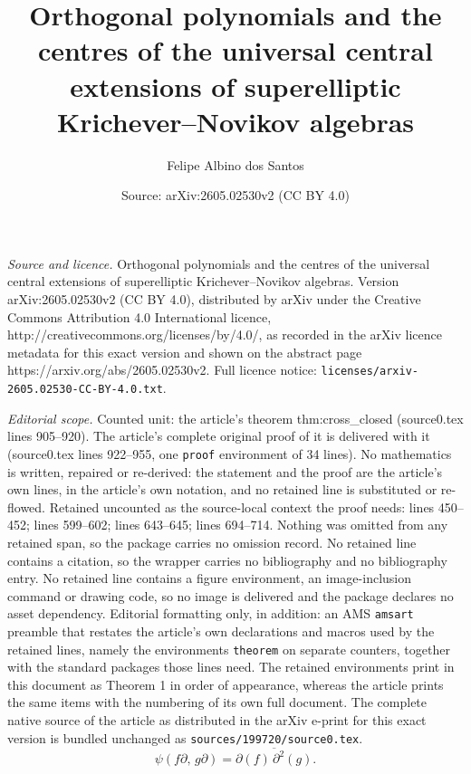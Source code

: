 \documentclass[10pt,a4paper]{amsart}
\title{Orthogonal polynomials and the centres of the universal central extensions of superelliptic Krichever--Novikov algebras}
\author{Felipe Albino dos Santos}
\date{Source: arXiv:2605.02530v2 (CC BY 4.0)}
\newcommand{\ol}[1]{\overline{#1}}
\newcommand{\pa}{\partial}
\begin{document}
\maketitle

\noindent\emph{Source and licence.} Orthogonal polynomials and the centres of the universal central extensions of superelliptic Krichever--Novikov algebras. Version arXiv:2605.02530v2 (CC BY 4.0), distributed by arXiv under the Creative Commons Attribution 4.0 International licence, http://creativecommons.org/licenses/by/4.0/, as recorded in the arXiv licence metadata for this exact version and shown on the abstract page https://arxiv.org/abs/2605.02530v2. Full licence notice: \texttt{licenses/arxiv-2605.02530-CC-BY-4.0.txt}.\par\smallskip

\noindent\textit{Editorial scope.} Counted unit: the article's theorem thm:cross\_closed (source0.tex lines 905--920). The article's complete original proof of it is delivered with it (source0.tex lines 922--955, one \texttt{proof} environment of 34 lines). No mathematics is written, repaired or re-derived: the statement and the proof are the article's own lines, in the article's own notation, and no retained line is substituted or re-flowed.  Retained uncounted as the source-local context the proof needs: lines 450--452; lines 599--602; lines 643--645; lines 694--714.  Nothing was omitted from any retained span, so the package carries no omission record.  No retained line contains a citation, so the wrapper carries no bibliography and no bibliography entry.  No retained line contains a figure environment, an image-inclusion command or drawing code, so no image is delivered and the package declares no asset dependency.  Editorial formatting only, in addition: an AMS \texttt{amsart} preamble that restates the article's own declarations and macros used by the retained lines, namely the environments \texttt{theorem} on separate counters, together with the standard packages those lines need.  The retained environments print in this document as Theorem 1 in order of appearance, whereas the article prints the same items with the numbering of its own full document.  The complete native source of the article as distributed in the arXiv e-print for this exact version is bundled unchanged as \texttt{sources/199720/source0.tex}.
\begin{equation}\label{eq:psi_def}
  \psi(f\pa,\,g\pa) = \ol{\pa(f)\,\pa^2(g)} .
\end{equation}
\end{document}
